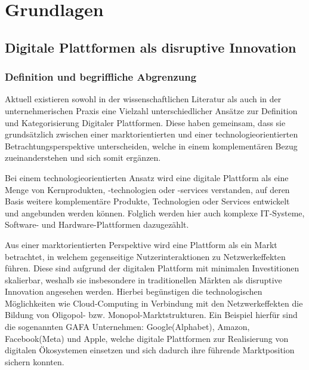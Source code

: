\chapter{Grundlagen}

\section{Digitale Plattformen als disruptive Innovation}

\subsection{Definition und begriffliche Abgrenzung}

Aktuell existieren sowohl in der wissenschaftlichen Literatur als auch in der unternehmerischen Praxis eine Vielzahl unterschiedlicher Ansätze zur Definition und Kategorisierung Digitaler Plattformen. Diese haben gemeinsam, dass sie grundsätzlich zwischen einer marktorientierten und einer technologieorientierten Betrachtungsperspektive unterscheiden, welche in einem komplementären Bezug zueinanderstehen und sich somit ergänzen. \autocite[Vgl.][S. 21-23]{ENGELS2017} \autocite[Vgl.][S.99]{MEINHARDT2019}

Bei einem technologieorientierten Ansatz wird eine digitale Plattform als eine Menge von Kernprodukten, -technologien oder -services verstanden, auf deren Basis weitere komplementäre Produkte, Technologien oder Services entwickelt und angebunden werden können. \autocite[Vgl.][S. 21]{ENGELS2017} Folglich werden hier auch komplexe IT-Systeme, Software- und Hardware-Plattformen dazugezählt.\autocite[Vgl.][S.222f]{WEINREICH2016}

Aus einer marktorientierten Perspektive wird eine Plattform als ein Markt betrachtet, in welchem gegenseitige Nutzerinteraktionen zu Netzwerkeffekten führen. \autocite[Vgl.][S. 1273f]{EISENMANN2011} Diese sind aufgrund der digitalen Plattform mit minimalen Investitionen skalierbar, weshalb sie insbesondere in traditionellen Märkten als disruptive Innovation angesehen werden. \autocite[Vgl.][S. 17ff]{MOAZED2016} Hierbei begünstigen die technologischen Möglichkeiten wie Cloud-Computing in Verbindung mit den Netzwerkeffekten die Bildung von Oligopol- bzw. Monopol-Marktstrukturen.\autocite[Vgl.][S. 23]{ENGELS2017} Ein Beispiel hierfür sind die sogenannten GAFA Unternehmen: Google(Alphabet), Amazon, Facebook(Meta) und Apple, welche digitale Plattformen zur Realisierung von digitalen Ökosystemen einsetzen und sich dadurch ihre führende Marktposition sichern konnten. \autocite[Vgl.][S. 92f]{BUNTE2020} 

